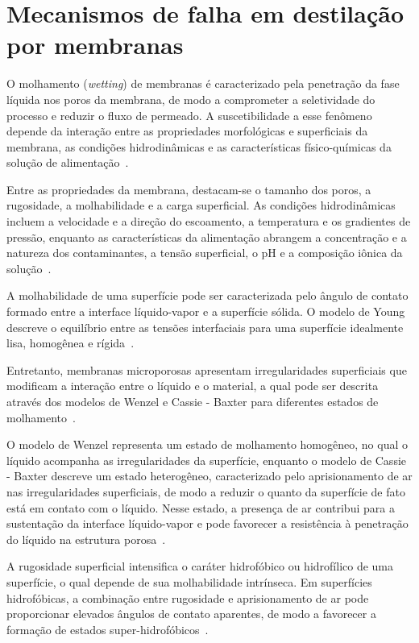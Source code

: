 \section{Mecanismos de falha em destilação por membranas}

O molhamento (\textit{wetting}) de membranas é caracterizado pela penetração da fase líquida nos poros da membrana, de modo a comprometer a seletividade do processo e reduzir o fluxo de permeado. A suscetibilidade a esse fenômeno depende da interação entre as propriedades morfológicas e superficiais da membrana, as condições hidrodinâmicas e as características físico-químicas da solução de alimentação~\cite{Yao2020WettabilityMD, Yang2021Antiwetting}.

Entre as propriedades da membrana, destacam-se o tamanho dos poros, a rugosidade, a molhabilidade e a carga superficial. As condições hidrodinâmicas incluem a velocidade e a direção do escoamento, a temperatura e os gradientes de pressão, enquanto as características da alimentação abrangem a concentração e a natureza dos contaminantes, a tensão superficial, o pH e a composição iônica da solução~\cite{Yao2020WettabilityMD}. 

A molhabilidade de uma superfície pode ser caracterizada pelo ângulo de contato formado entre a interface líquido-vapor e a superfície sólida. O modelo de Young descreve o equilíbrio entre as tensões interfaciais para uma superfície idealmente lisa, homogênea e rígida~\cite{Yao2020WettabilityMD,Samadi2023Antiwetting}. 

Entretanto, membranas microporosas apresentam irregularidades superficiais que modificam a interação entre o líquido e o material, a qual pode ser descrita através dos modelos de Wenzel e Cassie - Baxter para diferentes estados de molhamento~\cite{Yao2020WettabilityMD,Samadi2023Antiwetting}.

O modelo de Wenzel representa um estado de molhamento homogêneo, no qual o líquido acompanha as irregularidades da superfície, enquanto o modelo de Cassie - Baxter descreve um estado heterogêneo, caracterizado pelo aprisionamento de ar nas irregularidades superficiais, de modo a reduzir o quanto da superfície de fato está em contato com o líquido. Nesse estado, a presença de ar contribui para a sustentação da interface líquido-vapor e pode favorecer a resistência à penetração do líquido na estrutura porosa~\cite{Yao2020WettabilityMD,Samadi2023Antiwetting}.

A rugosidade superficial intensifica o caráter hidrofóbico ou hidrofílico de uma superfície, o qual depende de sua molhabilidade intrínseca. Em superfícies hidrofóbicas, a combinação entre rugosidade e aprisionamento de ar pode proporcionar elevados ângulos de contato aparentes, de modo a favorecer a formação de estados super-hidrofóbicos~\cite{Yao2020WettabilityMD,Samadi2023Antiwetting}.

